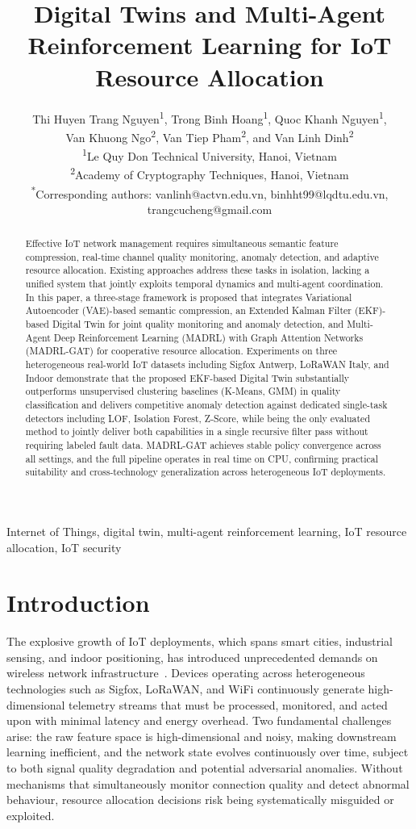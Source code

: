 \documentclass[conference]{IEEEtran}
\title{Digital Twins and Multi-Agent Reinforcement Learning for IoT Resource Allocation}
\author{
Thi Huyen Trang Nguyen\textsuperscript{1}, 
Trong Binh Hoang\textsuperscript{1}, 
Quoc Khanh Nguyen\textsuperscript{1},\\ 
Van Khuong Ngo\textsuperscript{2}, 
Van Tiep Pham\textsuperscript{2}, and 
Van Linh Dinh\textsuperscript{2} \\[1em]

\normalsize
\textsuperscript{1}Le Quy Don Technical University, Hanoi, Vietnam\\
\textsuperscript{2}Academy of Cryptography Techniques, Hanoi, Vietnam\\[0.5em]

\textsuperscript{*}Corresponding authors: vanlinh@actvn.edu.vn, binhht99@lqdtu.edu.vn, trangcucheng@gmail.com}
\begin{document}
\maketitle
\begin{abstract}
Effective IoT network management requires simultaneous semantic feature
compression, real-time channel quality monitoring, anomaly detection, and
adaptive resource allocation. Existing approaches address these tasks in
isolation, lacking a unified system that jointly exploits temporal dynamics
and multi-agent coordination. In this paper, a three-stage framework is proposed that integrates
Variational Autoencoder (VAE)-based semantic compression, an Extended Kalman Filter (EKF)-based Digital Twin for joint
quality monitoring and anomaly detection, and Multi-Agent Deep Reinforcement Learning (MADRL) with Graph Attention
Networks (MADRL-GAT) for cooperative resource allocation.
Experiments on three heterogeneous real-world IoT datasets
including Sigfox Antwerp, LoRaWAN Italy, and Indoor demonstrate that the proposed
EKF-based Digital Twin substantially outperforms unsupervised clustering baselines
(K-Means, GMM) in quality classification and delivers competitive anomaly detection
against dedicated single-task detectors including LOF, Isolation Forest, Z-Score, while
being the only evaluated method to jointly deliver both capabilities in a single
recursive filter pass without requiring labeled fault data. MADRL-GAT achieves
stable policy convergence across all settings, and the full pipeline operates in
real time on CPU, confirming practical suitability and cross-technology
generalization across heterogeneous IoT deployments.
\end{abstract}

\begin{IEEEkeywords}
Internet of Things, digital twin, multi-agent reinforcement learning, IoT resource allocation, IoT security
\end{IEEEkeywords}

\section{Introduction}
\label{sec:intro}

The explosive growth of IoT deployments, which spans smart
cities, industrial sensing, and indoor positioning, has introduced
unprecedented demands on wireless network infrastructure~\cite{ref_iot_overview}. Devices operating
across heterogeneous technologies such as Sigfox, LoRaWAN, and WiFi
continuously generate high-dimensional telemetry streams that must be
processed, monitored, and acted upon with minimal latency and energy
overhead. Two fundamental challenges arise: the raw
feature space is high-dimensional and noisy, making downstream learning
inefficient, and the network state evolves continuously over time, subject to both
signal quality degradation and potential adversarial anomalies. Without
mechanisms that simultaneously monitor connection quality and detect
abnormal behaviour, resource allocation decisions risk being
systematically misguided or exploited.
\end{document}
